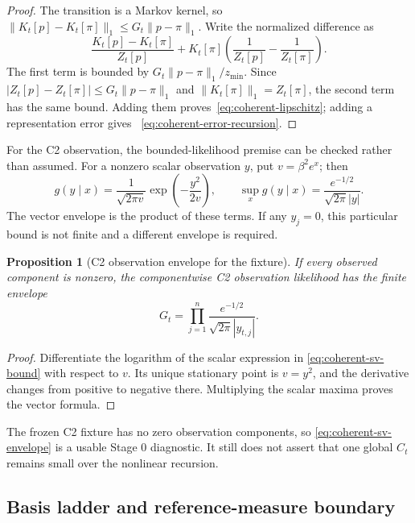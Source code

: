 \documentclass[11pt]{article}
\newtheorem{proposition}{Proposition}
\begin{document}
\begin{proof}
The transition is a Markov kernel, so
$\|K_t[p]-K_t[\pi]\|_1\leq G_t\|p-\pi\|_1$. Write the normalized
difference as
\[
 \frac{K_t[p]-K_t[\pi]}{Z_t[p]}
 +K_t[\pi]\left(\frac1{Z_t[p]}-\frac1{Z_t[\pi]}\right).
\]
The first term is bounded by $G_t\|p-\pi\|_1/z_{\min}$. Since
$|Z_t[p]-Z_t[\pi]|\leq G_t\|p-\pi\|_1$ and
$\|K_t[\pi]\|_1=Z_t[\pi]$, the second term has the same bound. Adding them
proves~\eqref{eq:coherent-lipschitz}; adding a representation error gives
~\eqref{eq:coherent-error-recursion}.
\end{proof}

For the C2 observation, the bounded-likelihood premise can be checked rather
than assumed. For a nonzero scalar observation $y$, put $v=\beta^2e^x$; then
\begin{equation}\label{eq:coherent-sv-bound}
 g(y\mid x)=\frac{1}{\sqrt{2\pi v}}\exp\left(-\frac{y^2}{2v}\right),
 \qquad
 \sup_xg(y\mid x)=\frac{e^{-1/2}}{\sqrt{2\pi}|y|}.
\end{equation}
The vector envelope is the product of these terms. If any $y_j=0$, this
particular bound is not finite and a different envelope is required.

\begin{proposition}[C2 observation envelope for the fixture]
\label{prop:coherent-sv-envelope}
If every observed component is nonzero, the componentwise C2 observation
likelihood has the finite envelope
\begin{equation}\label{eq:coherent-sv-envelope}
 G_t=\prod_{j=1}^n\frac{e^{-1/2}}{\sqrt{2\pi}|y_{t,j}|}.
\end{equation}
\end{proposition}

\begin{proof}
Differentiate the logarithm of the scalar expression in
\eqref{eq:coherent-sv-bound} with respect to $v$. Its unique stationary point
is $v=y^2$, and the derivative changes from positive to negative there.
Multiplying the scalar maxima proves the vector formula.
\end{proof}

The frozen C2 fixture has no zero observation components, so
\eqref{eq:coherent-sv-envelope} is a usable Stage 0 diagnostic. It still does
not assert that one global $C_t$ remains small over the nonlinear recursion.

\subsection{Basis ladder and reference-measure boundary}
\end{document}
